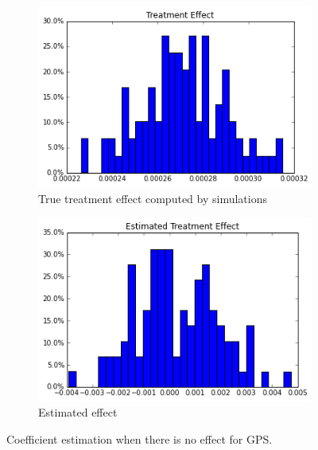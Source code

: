 \documentclass[11pt]{article}
\begin{document}
\begin{figure}[h]
\centering
\begin{subfigure}{.5\textwidth}
  \centering
  \includegraphics[width=.9\linewidth]{treatment_effect_no_influence.png}
  \caption{True treatment effect computed by simulations}
  \label{fig:sub1}
\end{subfigure}%
\begin{subfigure}{.5\textwidth}
  \centering
  \includegraphics[width=.9\linewidth]{estimated_no_influence.png}
  \caption{Estimated effect}
  \label{fig:sub2}
\end{subfigure}
\caption{Coefficient estimation when there is no effect for GPS.}
\label{fig:small_effect_gps}
\end{figure}
\end{document}

